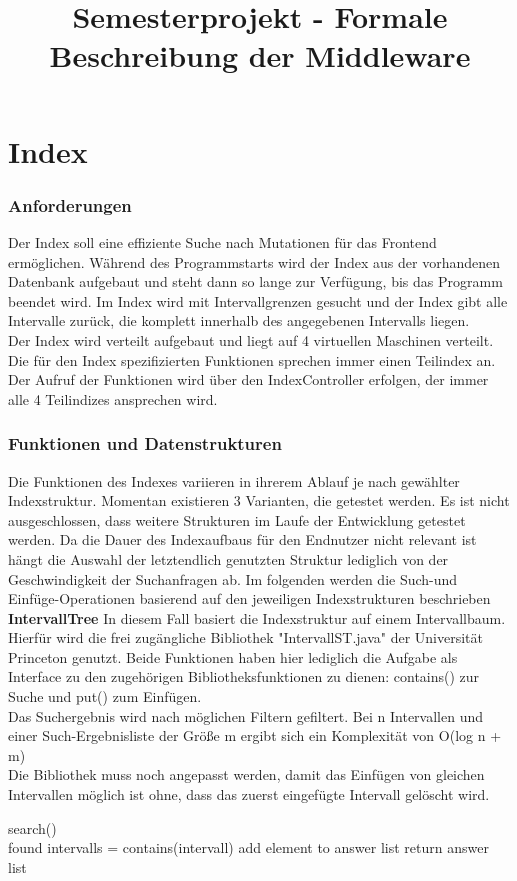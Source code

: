 \documentclass[]{article}
\title{Semesterprojekt - Formale Beschreibung der Middleware}
\begin{document}
\maketitle
\section{Index}

\subsubsection{Anforderungen}
Der Index soll eine effiziente Suche nach Mutationen für das Frontend ermöglichen. Während des Programmstarts wird der Index aus der vorhandenen Datenbank aufgebaut und steht dann so lange zur Verfügung, bis das Programm beendet wird.
Im Index wird mit Intervallgrenzen gesucht und der Index gibt alle Intervalle zurück, die komplett innerhalb des angegebenen Intervalls liegen.\\
Der Index wird verteilt aufgebaut und liegt auf 4 virtuellen Maschinen verteilt. Die für den Index spezifizierten Funktionen sprechen immer einen Teilindex an. Der Aufruf der Funktionen wird über den IndexController erfolgen, der immer alle 4 Teilindizes ansprechen wird.
\subsubsection{Funktionen und Datenstrukturen}
Die Funktionen des Indexes variieren in ihrerem Ablauf je nach gewählter Indexstruktur. Momentan existieren 3 Varianten, die getestet werden. Es ist nicht ausgeschlossen, dass weitere Strukturen im Laufe der Entwicklung getestet werden. Da die Dauer des Indexaufbaus für den Endnutzer nicht relevant ist hängt die Auswahl der letztendlich genutzten Struktur lediglich von der Geschwindigkeit der Suchanfragen ab.
Im folgenden werden die Such-und Einfüge-Operationen basierend auf den jeweiligen Indexstrukturen beschrieben
\newpage
\textbf{IntervallTree}
In diesem Fall basiert die Indexstruktur auf einem Intervallbaum.\\
Hierfür wird die frei zugängliche Bibliothek "IntervallST.java" der Universität Princeton genutzt. Beide Funktionen haben hier lediglich die Aufgabe als Interface zu den zugehörigen Bibliotheksfunktionen zu dienen: contains() zur Suche und put() zum Einfügen.\\
Das Suchergebnis wird nach möglichen Filtern gefiltert. Bei n Intervallen und einer Such-Ergebnisliste der Größe m ergibt sich ein Komplexität von O(log n + m)\\ Die Bibliothek muss noch angepasst werden, damit das Einfügen von gleichen Intervallen möglich ist ohne, dass das zuerst eingefügte Intervall gelöscht wird.
\begin{algorithm}
search()\\{
found intervalls = contains(intervall)\;
{
{
{add element to answer list\;}
}
return answer list\;
}
}
\end{algorithm}
\end{document}
